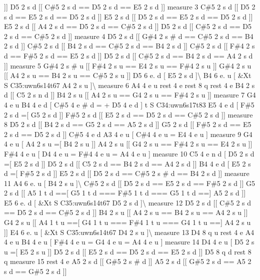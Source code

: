 \mbox{]}\mbox{]} D5 2 s d \mbox{[}\mbox{[} C\#5 2 s d == D5 2 s d == E5 2 s d \mbox{]}\mbox{]} measure 3 C\#5 2 s d \mbox{[}\mbox{[} D5 2 s d == E5 2 s d == D5 2 s d \mbox{]}\mbox{]} E5 2 s d \mbox{[}\mbox{[} D5 2 s d == E5 2 s d == D5 2 s d \mbox{]}\mbox{]} E5 2 s d \mbox{[}\mbox{[} A4 2 s d == D5 2 s d == C\#5 2 s d \mbox{]}\mbox{]} D5 2 s d \mbox{[}\mbox{[} C\#5 2 s d == D5 2 s d == C\#5 2 s d \mbox{]}\mbox{]} measure 4 D5 2 s d \mbox{[}\mbox{[} G\#4 2 s \# d == C\#5 2 s d == B4 2 s d \mbox{]}\mbox{]} C\#5 2 s d \mbox{[}\mbox{[} B4 2 s d == C\#5 2 s d == B4 2 s d \mbox{]}\mbox{]} C\#5 2 s d \mbox{[}\mbox{[} F\#4 2 s d == F\#5 2 s d == E5 2 s d \mbox{]}\mbox{]} D5 2 s d \mbox{[}\mbox{[} C\#5 2 s d == B4 2 s d == A4 2 s d \mbox{]}\mbox{]} measure 5 G\#4 2 s \# u \mbox{[}\mbox{[} F\#4 2 s u == E4 2 s u == F\#4 2 s u \mbox{]}\mbox{]} G\#4 2 s u \mbox{[}\mbox{[} A4 2 s u == B4 2 s u == C\#5 2 s u \mbox{]}\mbox{]} D5 6 e. d \mbox{[} E5 2 s d \mbox{]}\textbackslash{} B4 6 e. u \mbox{[} \&Xt S C35\+:uwn6s14t67 A4 2 s u \mbox{]}\textbackslash{} measure 6 A4 4 e u rest 4 e rest 8 q rest 4 e B4 2 s d \mbox{[}\mbox{[} C5 2 s n d \mbox{]}\mbox{]} B4 2 s u \mbox{[}\mbox{[} A4 2 s u == G4 2 s u == F\#4 2 s u \mbox{]}\mbox{]} measure 7 G4 4 e u B4 4 e d \mbox{[} C\#5 4 e \# d = + D5 4 e d \mbox{]} t S C34\+:uwn6s17t83 E5 4 e d \mbox{[} F\#5 2 s d =\mbox{[} G5 2 s d \mbox{]}\mbox{]} F\#5 2 s d \mbox{[}\mbox{[} E5 2 s d == D5 2 s d == C\#5 2 s d \mbox{]}\mbox{]} measure 8 D5 2 s d \mbox{[}\mbox{[} B4 2 s d == G5 2 s d == A5 2 s d \mbox{]}\mbox{]} G5 2 s d \mbox{[}\mbox{[} F\#5 2 s d == E5 2 s d == D5 2 s d \mbox{]}\mbox{]} C\#5 4 e d A3 4 e u \mbox{[} C\#4 4 e u = E4 4 e u \mbox{]} measure 9 G4 4 e u \mbox{[} A4 2 s u =\mbox{[} B4 2 s u \mbox{]}\mbox{]} A4 2 s u \mbox{[}\mbox{[} G4 2 s u == F\#4 2 s u == E4 2 s u \mbox{]}\mbox{]} F\#4 4 e u \mbox{[} D4 4 e u = F\#4 4 e u = A4 4 e u \mbox{]} measure 10 C5 4 e n d \mbox{[} D5 2 s d =\mbox{[} E5 2 s d \mbox{]}\mbox{]} D5 2 s d \mbox{[}\mbox{[} C5 2 s d == B4 2 s d == A4 2 s d \mbox{]}\mbox{]} B4 4 e d \mbox{[} E5 2 s d =\mbox{[} F\#5 2 s d \mbox{]}\mbox{]} E5 2 s d \mbox{[}\mbox{[} D5 2 s d == C\#5 2 s \# d == B4 2 s d \mbox{]}\mbox{]} measure 11 A4 6 e. u \mbox{[} B4 2 s u \mbox{]}\textbackslash{} C\#5 2 s d \mbox{[}\mbox{[} D5 2 s d == E5 2 s d == F\#5 2 s d \mbox{]}\mbox{]} G5 2 s d \mbox{[}\mbox{[} A5 1 t d ==\mbox{[} G5 1 t d === F\#5 1 t d === G5 1 t d ==\mbox{]} A5 2 s d \mbox{]}\mbox{]} E5 6 e. d \mbox{[} \&Xt S C35\+:uwn6s14t67 D5 2 s d \mbox{]}\textbackslash{} measure 12 D5 2 s d \mbox{[}\mbox{[} C\#5 2 s d == D5 2 s d == C\#5 2 s d \mbox{]}\mbox{]} B4 2 s u \mbox{[}\mbox{[} A4 2 s u == B4 2 s u == A4 2 s u \mbox{]}\mbox{]} G4 2 s u \mbox{[}\mbox{[} A4 1 t u ==\mbox{[} G4 1 t u === F\#4 1 t u === G4 1 t u ==\mbox{]} A4 2 s u \mbox{]}\mbox{]} E4 6 e. u \mbox{[} \&Xt S C35\+:uwn6s14t67 D4 2 s u \mbox{]}\textbackslash{} measure 13 D4 8 q u rest 4 e A4 4 e u B4 4 e u \mbox{[} F\#4 4 e u = G4 4 e u = A4 4 e u \mbox{]} measure 14 D4 4 e u \mbox{[} D5 2 s u =\mbox{[} E5 2 s u \mbox{]}\mbox{]} D5 2 s d \mbox{[}\mbox{[} E5 2 s d == D5 2 s d == E5 2 s d \mbox{]}\mbox{]} D5 8 q d rest 8 q measure 15 rest 4 e A5 2 s d \mbox{[}\mbox{[} G\#5 2 s \# d \mbox{]}\mbox{]} A5 2 s d \mbox{[}\mbox{[} G\#5 2 s d == A5 2 s d == G\#5 2 s d \mbox{]}\mbox{]} 